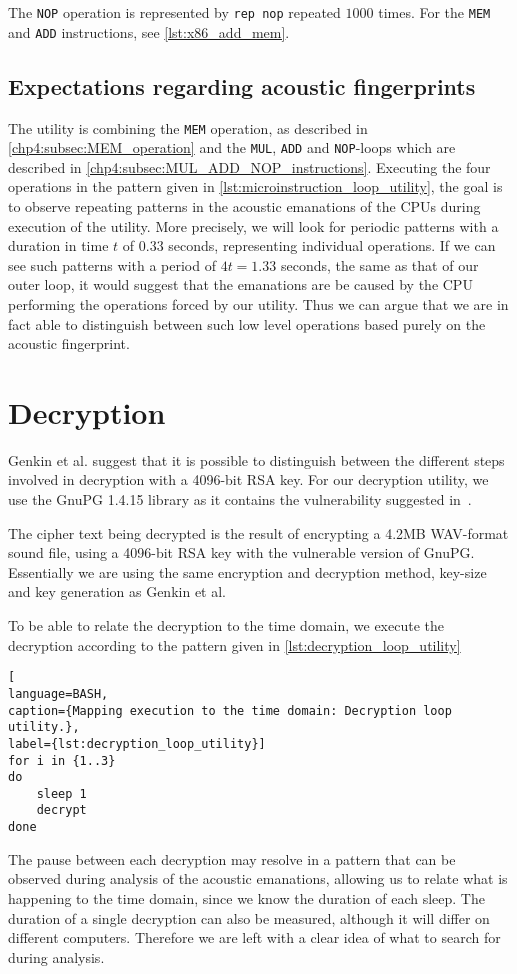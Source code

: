 The \texttt{NOP} operation is represented by \texttt{rep nop} repeated \(1000\) times.
For the \texttt{MEM} and \texttt{ADD} instructions, see \autoref{lst:x86_add_mem}.


\subsection{Expectations regarding acoustic fingerprints}
The utility is combining the \texttt{MEM} operation, as described in \autoref{chp4:subsec:MEM_operation} and the \texttt{MUL}, \texttt{ADD} and \texttt{NOP}-loops which are described in \autoref{chp4:subsec:MUL_ADD_NOP_instructions}.
Executing the four operations in the pattern given in \autoref{lst:microinstruction_loop_utility}, the goal is to observe repeating patterns in the acoustic emanations of the \gls{CPU}s during execution of the utility.
More precisely, we will look for periodic patterns with a duration in time \(t\) of \(0.33\) seconds, representing individual operations. 
If we can see such patterns with a period of \(4t = 1.33\) seconds, the same as that of our outer loop, it would suggest that the emanations are be caused by the \gls{CPU} performing the operations forced by our utility.
Thus we can argue that we are in fact able to distinguish between such low level operations based purely on the acoustic fingerprint. 


\section{Decryption}\label{chp4:sec:decryption}
Genkin et al. suggest that it is possible to distinguish between the different steps involved in decryption with a 4096-bit RSA key.
For our decryption utility, we use the GnuPG 1.4.15 library as it contains the vulnerability suggested in~\cite[Sec.~9.1]{DBLP:conf/crypto/GenkinST14}. 

The cipher text being decrypted is the result of encrypting a 4.2MB \gls{WAV}-format sound file, using a 4096-bit RSA key with the vulnerable version of GnuPG.
Essentially we are using the same encryption and decryption method, key-size and key generation as Genkin et al. 

To be able to relate the decryption to the time domain, we execute the decryption according to the pattern given in \autoref{lst:decryption_loop_utility}

\begin{lstlisting}[
language=BASH, 
caption={Mapping execution to the time domain: Decryption loop utility.}, 
label={lst:decryption_loop_utility}]
for i in {1..3}
do
    sleep 1
    decrypt
done
\end{lstlisting}

The pause between each decryption may resolve in a pattern that can be observed during analysis of the acoustic emanations, allowing us to relate what is happening to the time domain, since we know the duration of each sleep.
The duration of a single decryption can also be measured, although it will differ on different computers.
Therefore we are left with a clear idea of what to search for during analysis.
